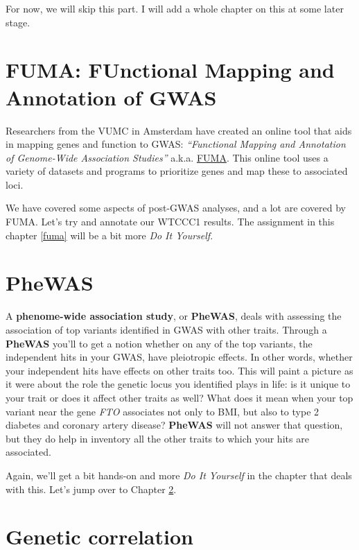 \documentclass[
]{book}
\begin{document}
For now, we will skip this part. I will add a whole chapter on this at some later stage.

\hypertarget{fuma-functional-mapping-and-annotation-of-gwas}{%
\section{FUMA: FUnctional Mapping and Annotation of GWAS}\label{fuma-functional-mapping-and-annotation-of-gwas}}

Researchers from the VUMC in Amsterdam have created an online tool that aids in mapping genes and function to GWAS: \emph{``Functional Mapping and Annotation of Genome-Wide Association Studies''} a.k.a. \href{https://fuma.ctglab.nl}{FUMA}. This online tool uses a variety of datasets and programs to prioritize genes and map these to associated loci.

We have covered some aspects of post-GWAS analyses, and a lot are covered by FUMA. Let's try and annotate our WTCCC1 results. The assignment in this chapter \ref{fuma} will be a bit more \emph{Do It Yourself}.

\hypertarget{phewas}{%
\section{PheWAS}\label{phewas}}

A \textbf{phenome-wide association study}, or \textbf{PheWAS}, deals with assessing the association of top variants identified in GWAS with other traits. Through a \textbf{PheWAS} you'll to get a notion whether on any of the top variants, the independent hits in your GWAS, have pleiotropic effects. In other words, whether your independent hits have effects on other traits too. This will paint a picture as it were about the role the genetic locus you identified plays in life: is it unique to your trait or does it affect other traits as well? What does it mean when your top variant near the gene \emph{FTO} associates not only to BMI, but also to type 2 diabetes and coronary artery disease? \textbf{PheWAS} will not answer that question, but they do help in inventory all the other traits to which your hits are associated.

Again, we'll get a bit hands-on and more \emph{Do It Yourself} in the chapter that deals with this. Let's jump over to Chapter \ref{phewas}.

\hypertarget{genetic-correlation}{%
\section{Genetic correlation}\label{genetic-correlation}}
\end{document}
